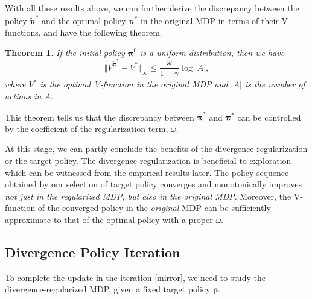 \documentclass{article}
\newtheorem{theorem}{Theorem}
\begin{document}
With all these results above, we can further derive the discrepancy between the policy $\tilde{\bm{\pi}}^{*}$ and the optimal policy $\bm{\pi}^*$ in the original MDP in terms of their V-functions, and have the following theorem.
\begin{theorem} \label{theorem:global_optimal}
    If the initial policy $\bm{\pi}^0$ is a uniform distribution, then we have 
    \begin{equation}\label{eq:global_optimal}
        \Vert V^{\tilde{\bm{\pi}}^*} - V^* \Vert_{\infty} \le \frac{\omega}{1 - \gamma} \log |A|, 
    \end{equation}
    where $V^*$ is the optimal V-function in the original MDP and $|A|$ is the number of actions in $A$.
\end{theorem}
This theorem tells us that the discrepancy between $\tilde{\bm{\pi}}^{*}$ and $\bm{\pi}^*$ can be controlled by the coefficient of the regularization term, $\omega$.

At this stage, we can partly conclude the benefits of the divergence regularization or the target policy. The divergence regularization is beneficial to exploration which can be witnessed from the empirical results later. The policy sequence obtained by our selection of target policy converges and monotonically improves \textit{not just in the regularized MDP, but also in the original MDP}. Moreover, the V-function of the converged policy in the \textit{original} MDP can be sufficiently approximate to that of the optimal policy with a proper $\omega$.



\subsection{Divergence Policy Iteration}

To complete the update in the iteration \eqref{mirror}, we need to study the divergence-regularized MDP, given a fixed target policy $\bm{\rho}$. 
\end{document}

